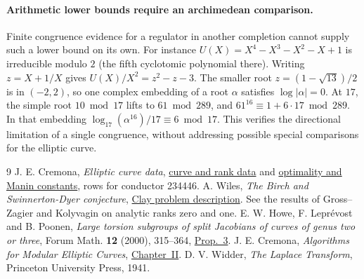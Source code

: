 \documentclass[11pt]{article}
\begin{document}
\paragraph{Arithmetic lower bounds require an archimedean comparison.}
Finite congruence evidence for a regulator in another completion cannot
supply such a lower bound on its own. For instance
\(U(X)=X^4-X^3-X^2-X+1\) is irreducible modulo \(2\) (the fifth
cyclotomic polynomial there). Writing \(z=X+1/X\) gives
\(U(X)/X^2=z^2-z-3\). The smaller root \(z=(1-\sqrt{13})/2\)
is in \((-2,2)\), so one complex embedding of a root \(\alpha\)
satisfies \(\log|\alpha|=0\).
At \(17\), the simple root \(10\bmod17\) lifts to \(61\bmod289\),
and \(61^{16}\equiv1+6\cdot17\bmod289\).
In that embedding \(\log_{17}(\alpha^{16})/17\equiv6\bmod17\).
This verifies the directional limitation of a single congruence,
without addressing possible special comparisons for the elliptic
curve.

\begin{thebibliography}{9}
 J. E. Cremona, \emph{Elliptic curve data},
\href{https://github.com/JohnCremona/ecdata/blob/master/allcurves/allcurves.230000-239999}{curve and rank data}
and \href{https://github.com/JohnCremona/ecdata/blob/master/opt_man/opt_man.230000-239999}{optimality and Manin constants}, rows for conductor 234446.
 A. Wiles, \emph{The Birch and Swinnerton-Dyer conjecture},
\href{https://www.claymath.org/wp-content/uploads/2022/05/birchswin.pdf}{Clay problem description}. See the results of Gross--Zagier and Kolyvagin on analytic ranks zero and one.
 E. W. Howe, F. Lepr\'evost and B. Poonen,
\emph{Large torsion subgroups of split Jacobians of curves of genus two or three}, Forum Math. \textbf{12} (2000), 315--364,
\href{https://math.mit.edu/~poonen/papers/large.pdf}{Prop.~3}.
 J. E. Cremona, \emph{Algorithms for Modular Elliptic Curves},
\href{https://johncremona.github.io/book/fulltext/chapter2.pdf}{Chapter~II}.
 D. V. Widder, \emph{The Laplace Transform}, Princeton University Press, 1941.
\end{thebibliography}
\end{document}
